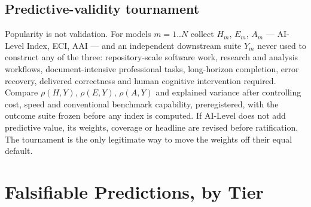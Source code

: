\subsection{Predictive-validity tournament}\label{sec:tournament}
Popularity is not validation. For models $m = 1..N$ collect $H_m$, $E_m$, $A_m$ --- AI-Level Index, ECI, AAI --- and an independent downstream suite $Y_m$ never used to construct any of the three: repository-scale software work, research and analysis workflows, document-intensive professional tasks, long-horizon completion, error recovery, delivered correctness and human cognitive intervention required. Compare $\rho(H, Y)$, $\rho(E, Y)$, $\rho(A, Y)$ and explained variance after controlling cost, speed and conventional benchmark capability, preregistered, with the outcome suite frozen before any index is computed. If AI-Level does not add predictive value, its weights, coverage or headline are revised before ratification. The tournament is the only legitimate way to move the weights off their equal default.

\section{Falsifiable Predictions, by Tier}\label{sec:predictions}

